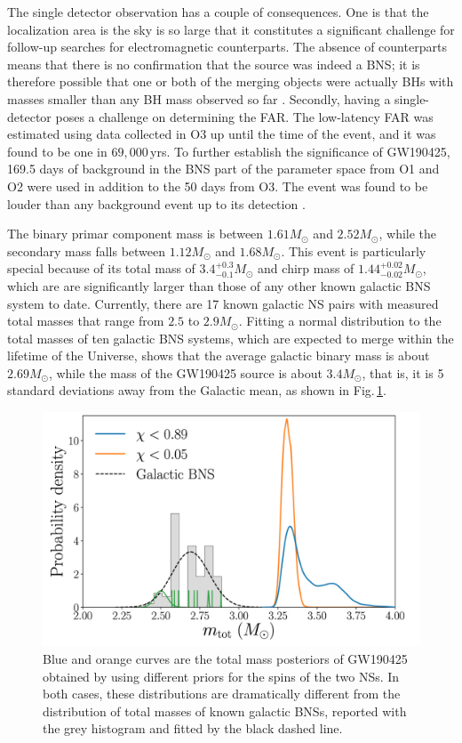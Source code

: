 \documentclass[binding=0.6cm, LaM]{sapthesis}
\begin{document}
	The single detector observation has a couple of consequences. 
	One is that the localization area is the sky is so large
	that it constitutes a significant challenge for follow-up searches for electromagnetic counterparts. 
	The absence of counterparts means that there is no confirmation that the source was indeed a BNS; 
	it is therefore possible that one or both of the merging objects were actually 
	BHs with masses smaller than any BH mass observed so far \cite{148}.
	Secondly, having a single-detector poses a challenge on determining the FAR.
	The low-latency FAR was estimated using data collected in O3 
	up until the time of the event, and it was found to be one in $69,000\,$yrs. 
	To further establish the significance of GW190425, 169.5 
	days of background in the BNS part of the parameter space from O1 and O2 were used in addition to the 50 days  
	from O3.  The event was found to be 
	louder than any background event up to its detection \cite{148}.

	The binary primar component mass is between $1.61M_\odot$ and $2.52 M_\odot$, 
	while the secondary mass falls between $1.12M_\odot$ and $1.68 M_\odot$.
	This event is particularly special because of its total mass of $3.4^{+0.3}_{-0.1} M_\odot$ 
	and chirp mass of $1.44^{+0.02}_{-0.02}M_\odot$, which are are significantly larger 
	than those of any other known galactic BNS system to date. 
	Currently, there are 17 known galactic NS pairs with measured total masses 
	that range from $2.5$ to $2.9M_\odot$.
	Fitting a normal distribution to the total masses of ten galactic BNS systems, 
	which are expected to merge within the lifetime of the Universe, 
	shows that the average galactic binary mass is about $2.69M_\odot$, 
	while the mass of the GW190425 source is about $3.4M_\odot$, that is,
	it is 5 standard deviations away from the Galactic mean, as shown in Fig.\,\ref{fig:secondbns}.

        \begin{figure}[!t]
          \label{secondbns}
          \includegraphics[scale=0.3]{secondbns}
          \centering
          \caption{Blue and orange curves are the total mass posteriors of GW190425 obtained by using different priors for the spins of the two NSs. In both cases, these distributions are dramatically different from the distribution of total masses of known galactic BNSs, reported with the grey histogram and fitted by the black dashed line. \cite{62}}
          \label{fig:secondbns}
        \end{figure}
\end{document}
